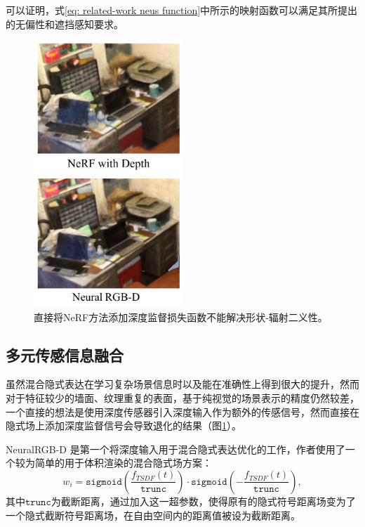 可以证明，式\ref{eq: related-work neus function}中所示的映射函数可以满足其所提出的无偏性和遮挡感知要求。

\begin{figure}[ht]
    \centering
    \includegraphics[width=0.5\textwidth]{undergraduate-thesis/images/related-work/neural-rgbd comparison with NeRF.png}
    \caption{直接将NeRF方法添加深度监督损失函数不能解决形状-辐射二义性。}
    \label{fig:related-work neural-rgbd comparison with NeRF}
\end{figure}

\subsection{多元传感信息融合}
虽然混合隐式表达在学习复杂场景信息时以及能在准确性上得到很大的提升，然而对于特征较少的墙面、纹理重复的表面，基于纯视觉的场景表示的精度仍然较差，一个直接的想法是使用深度传感器\cite{zabatani_intel_2020}引入深度输入作为额外的传感信号，然而直接在隐式场上添加深度监督信号会导致退化的结果（图\ref{fig:related-work neural-rgbd comparison with NeRF}）。

NeuralRGB-D 是第一个将深度输入用于混合隐式表达优化的工作\cite{azinovic_neural_2022}，作者使用了一个较为简单的用于体积渲染的混合隐式场方案：
\begin{equation}
    w_i = \mathtt{sigmoid}\left(\frac{f_{TSDF}(t)}{\mathtt{trunc}}\right)\cdot\mathtt{sigmoid}\left(-\frac{f_{TSDF}(t)}{\mathtt{trunc}}\right),
\end{equation}
其中$\mathtt{trunc}$为截断距离，通过加入这一超参数，使得原有的隐式符号距离场变为了一个隐式截断符号距离场，在自由空间内的距离值被设为截断距离。

